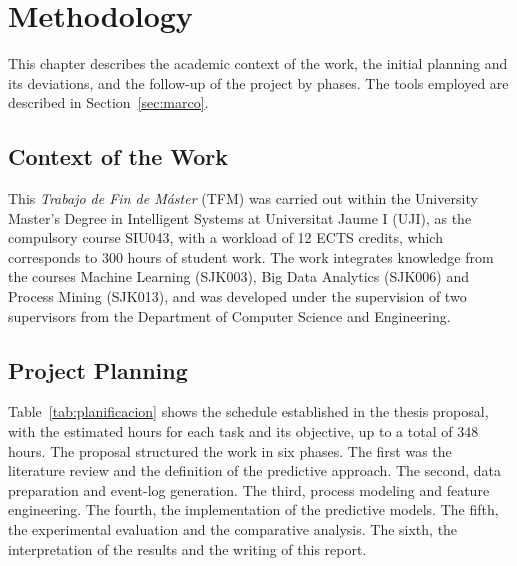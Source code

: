 \chapter{Methodology}
\label{cap:metodologia}

This chapter describes the academic context of the work, the initial planning and its deviations, and the follow-up of the project by phases. The tools employed are described in Section~\ref{sec:marco}.

\section{Context of the Work}

This \emph{Trabajo de Fin de M\'aster} (TFM) was carried out within the University Master's Degree in Intelligent Systems at Universitat Jaume I (UJI), as the compulsory course SIU043, with a workload of 12 ECTS credits, which corresponds to 300 hours of student work. The work integrates knowledge from the courses Machine Learning (SJK003), Big Data Analytics (SJK006) and Process Mining (SJK013), and was developed under the supervision of two supervisors from the Department of Computer Science and Engineering.

\section{Project Planning}

Table~\ref{tab:planificacion} shows the schedule established in the thesis proposal, with the estimated hours for each task and its objective, up to a total of 348 hours. The proposal structured the work in six phases. The first was the literature review and the definition of the predictive approach. The second, data preparation and event-log generation. The third, process modeling and feature engineering. The fourth, the implementation of the predictive models. The fifth, the experimental evaluation and the comparative analysis. The sixth, the interpretation of the results and the writing of this report.

